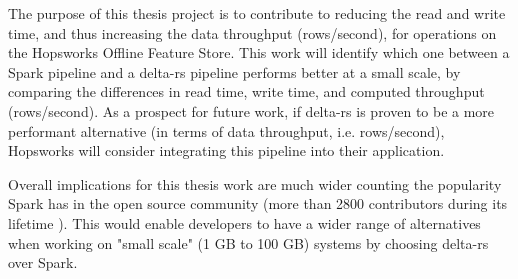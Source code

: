 The purpose of this thesis project is to contribute to reducing the read and write time, and thus increasing the data throughput (rows/second), for operations on the Hopsworks Offline Feature Store. This work will identify which one between a Spark pipeline and a delta-rs pipeline performs better at a small scale, by comparing the differences in read time, write time, and computed throughput (rows/second). As a prospect for future work, if delta-rs is proven to be a more performant alternative (in terms of data throughput, i.e. rows/second), Hopsworks will consider integrating this pipeline into their application.

Overall implications for this thesis work are much wider counting the popularity Spark has in the open source community (more than 2800 contributors during its lifetime \cite{ApacheSparkOpen}). This would enable developers to have a wider range of alternatives when working on "small scale" (1 GB to 100 GB) systems by choosing delta-rs over Spark.